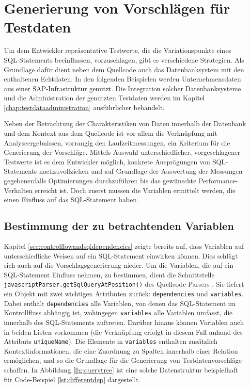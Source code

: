\section{Generierung von Vorschlägen für Testdaten}\label{chap:testdatasuggestions}

Um dem Entwickler repräsentative Testwerte, die die Variationspunkte eines SQL-Statements beeinflussen, vorzuschlagen, gibt es verschiedene Strategien.
Als Grundlage dafür dient neben dem Quellcode auch das Datenbanksystem mit den enthaltenen Echtdaten.
In den folgenden Beispielen werden Unternehmensdaten aus einer SAP-Infrastruktur genutzt.
Die Integration solcher Datenbanksysteme und die Administration der genutzten Testdaten werden im Kapitel \ref{chap:testdataadministration} ausführlicher behandelt.

Neben der Betrachtung der Charakteristiken von Daten innerhalb der Datenbank und dem Kontext aus dem Quellcode ist vor allem die Verknüpfung mit Analyseergebnissen, vorrangig den Laufzeitmessungen, ein Kriterium für die Generierung der Vorschläge.
Mittels Auswahl unterschiedlicher, vorgeschlagener Testwerte ist es dem Entwickler möglich, konkrete Ausprägungen von SQL-Statements nachzuvollziehen und auf Grundlage der Auswertung der Messungen gegebenenfalls Optimierungen durchzuführen bis das gewünschte Performance-Verhalten erreicht ist.
Doch zuerst müssen die Variablen ermittelt werden, die einen Einfluss auf das SQL-Statement haben.

\subsection{Bestimmung der zu betrachtenden Variablen}
Kapitel \ref{sec:controlflowandsqldependencies} zeigte bereits auf, dass Variablen auf unterschiedliche Weisen auf ein SQL-Statement einwirken können.
Dies schlägt sich auch auf die Vorschlagsgenerierung nieder.
Um die Variablen, die auf ein SQL-Statement Einfluss nehmen, zu bestimmen, dient die Schnittstelle \texttt{javascriptParser.getSqlQueryAtPosition()} des Quellcode-Parsers \cite{Horschig2014}.
Sie liefert ein Objekt mit zwei wichtigen Attributen zurück: \texttt{dependencies} und \texttt{variables}.
Dabei enthält \texttt{dependencies} alle Variablen, von denen das SQL-Statement im Kontrollfluss abhängig ist, wohingegen \texttt{variables} alle Variablen umfasst, die innerhalb des SQL-Statements auftreten.
Darüber hinaus können Variablen auch in beiden Listen vorkommen (die Verknüpfung erfolgt in diesem Fall anhand des Attributs \texttt{uniqueName}).
Die Elemente in \texttt{variables} enthalten zusätzlich Kontextinformationen, die eine Zuordnung zu Spalten innerhalb einer Relation ermöglichen, und so die Grundlage für die Generierung von Testdatenvorschläge schaffen.
In Abbildung \ref{fig:querytree} ist eine solche Datenstruktur beispielhaft für Code-Beispiel \ref{lst:differentdep} dargestellt.

